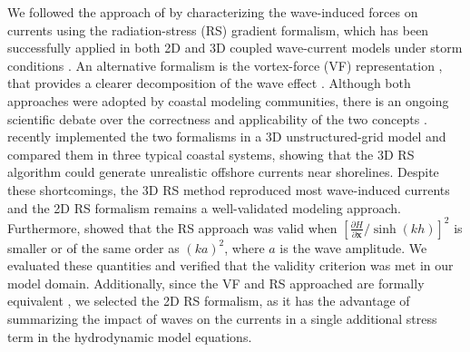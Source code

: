We followed the approach of \cite{dietrich2012performance} by characterizing the wave-induced forces on currents using the radiation-stress (RS) gradient formalism, which has been successfully applied in both 2D and 3D coupled wave-current models under storm conditions \citep{hope2013hindcast, sebastian2014characterizing, brown2013depth}. An alternative formalism is the vortex-force (VF) representation \citep{mcwilliams2004asymptotic}, that provides a clearer decomposition of the wave effect \citep{lane2007wave}. Although both approaches were adopted by coastal modeling communities, there is an ongoing scientific debate over the correctness and applicability of the two concepts \citep{ardhuin2008comments, mellor2013waves, mellor2015combined, ardhuin2017comments}. \cite{xia2020implementation} recently implemented the two formalisms in a 3D unstructured-grid model and compared them in three typical coastal systems, showing that the 3D RS algorithm could generate unrealistic offshore currents near shorelines. Despite these shortcomings, the 3D RS method reproduced most wave-induced currents and the 2D RS formalism remains a well-validated modeling approach. Furthermore, \cite{mellor2013waves} showed that the RS approach was valid when $[\frac{\partial H}{\partial\mathbf{x}}/\sinh(kh)]^2$ is smaller or of the same order as $(ka)^2$, where $a$ is the wave amplitude. We evaluated these quantities and verified that the validity criterion was met in our model domain. Additionally, since the VF and RS approached are formally equivalent \citep{lane2007wave}, we selected the 2D RS formalism, as it has the advantage of summarizing the impact of waves on the currents in a single additional stress term in the hydrodynamic model equations.

